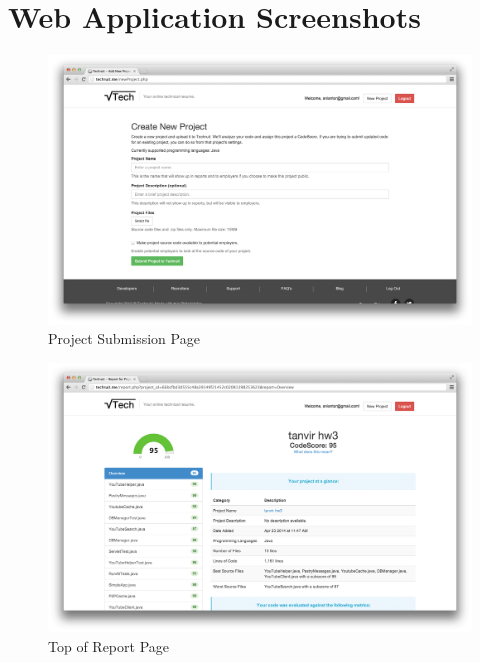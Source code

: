 \documentclass{sig-alternate}
\begin{document}
\vspace{175pt}
\onecolumn
\appendix
\section{Web Application Screenshots}

\begin{figure}[ht]
	\begin{center}
		\includegraphics[width=500px]{new_project.png}
	\end{center}
	\vspace{-12pt}
	\caption{Project Submission Page}
	\label{fig:report1}
\end{figure}

\begin{figure}[ht]
	\begin{center}
		\includegraphics[width=500px]{report_overview1}
	\end{center}
	\vspace{-12pt}
	\caption{Top of Report Page}
	\label{fig:report1}
\end{figure}
\end{document}
